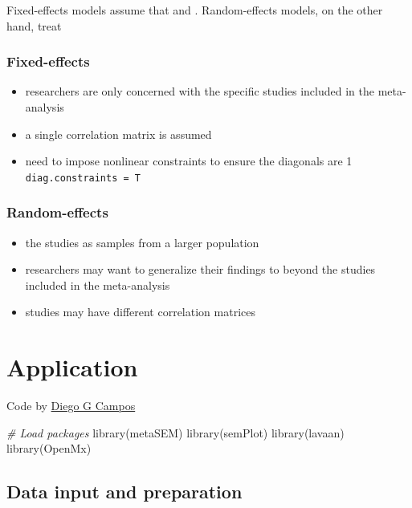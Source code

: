 \documentclass[
]{book}
\newenvironment{Shaded}{\begin{snugshade}}{\end{snugshade}}
\newcommand{\CommentTok}[1]{\textcolor[rgb]{0.56,0.35,0.01}{\textit{#1}}}
\newcommand{\FunctionTok}[1]{\textcolor[rgb]{0.00,0.00,0.00}{#1}}
\newcommand{\NormalTok}[1]{#1}
\begin{document}
Fixed-effects models assume that and . Random-effects models, on the other hand, treat

\hypertarget{fixed-effects}{%
\subsection{Fixed-effects}\label{fixed-effects}}

\begin{itemize}
\item
  researchers are only concerned with the specific studies included in the meta-analysis
\item
  a single correlation matrix is assumed
\item
  need to impose nonlinear constraints to ensure the diagonals are 1 \texttt{diag.constraints\ =\ T}
\end{itemize}

\hypertarget{random-effects}{%
\subsection{Random-effects}\label{random-effects}}

\begin{itemize}
\item
  the studies as samples from a larger population
\item
  researchers may want to generalize their findings to beyond the studies included in the meta-analysis
\item
  studies may have different correlation matrices
\end{itemize}

\hypertarget{application}{%
\chapter{Application}\label{application}}

Code by \href{https://osf.io/jnryt/?view_only=7eaaaedf59a8407cac5e52317b20bc3a}{Diego G Campos}

\begin{Shaded}
\begin{Highlighting}[]
\CommentTok{\# Load packages}
\FunctionTok{library}\NormalTok{(metaSEM)}
\FunctionTok{library}\NormalTok{(semPlot)}
\FunctionTok{library}\NormalTok{(lavaan)}
\FunctionTok{library}\NormalTok{(OpenMx)}
\end{Highlighting}
\end{Shaded}

\hypertarget{data-input-and-preparation}{%
\section{Data input and preparation}\label{data-input-and-preparation}}
\end{document}
